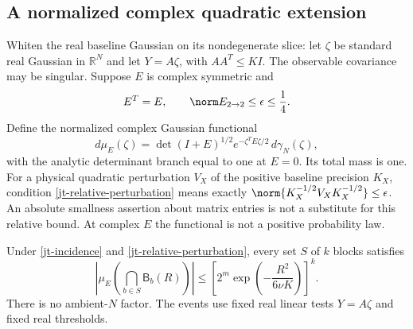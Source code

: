 \subsection{A normalized complex quadratic extension}
\label{jt-complex-section}

Whiten the real baseline Gaussian on its nondegenerate slice:
let $\zeta$ be standard real Gaussian in $\mathbb R^N$ and
let $Y=A\zeta$, with $AA^T\le KI$. The observable covariance
may be singular. Suppose $E$ is complex symmetric and
\begin{equation}\label{jt-relative-perturbation}
 E^T=E,\qquad \norm E_{2\to2}\le\epsilon\le\frac14.
\end{equation}
Define the normalized complex Gaussian functional
\begin{equation}\label{jt-complex-measure}
 d\mu_E(\zeta)=\det(I+E)^{1/2}
      e^{-\zeta^TE\zeta/2}\,d\gamma_N(\zeta),
\end{equation}
with the analytic determinant branch equal to one at $E=0$.
Its total mass is one. For a physical quadratic perturbation
$V_X$ of the positive baseline precision $K_X$, condition
\eqref{jt-relative-perturbation} means exactly
$\norm{K_X^{-1/2}V_XK_X^{-1/2}}\le\epsilon$.
An absolute smallness assertion about matrix entries is not a
substitute for this relative bound. At complex $E$ the functional
is not a positive probability law.

\begin{theorem}
\label{jt-complex-theorem}
Under \eqref{jt-incidence} and
\eqref{jt-relative-perturbation}, every set $S$ of $k$ blocks
satisfies
\begin{equation}\label{jt-complex-bound}
 \boxed{\quad
 \left|\mu_E\!\left(\bigcap_{b\in S}\mathsf B_b(R)\right)\right|
 \le\left[2^m\exp\!\left(-\frac{R^2}{6\nu K}\right)\right]^k.
 \quad}
\end{equation}
There is no ambient-$N$ factor. The events use fixed real linear
tests $Y=A\zeta$ and fixed real thresholds.
\end{theorem}

